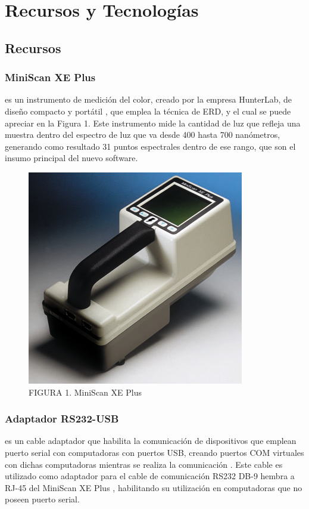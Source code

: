 \documentclass[conference]{IEEEtran}
\begin{document}
\section{Recursos y Tecnolog\'{i}as}	
	
	\subsection{Recursos}
		\subsubsection{MiniScan XE Plus}
		es un instrumento de medici\'{o}n del color, creado por la empresa HunterLab, de dise\~{n}o compacto y port\'{a}til \cite{MiniScanXEPlus-manual}, que emplea la t\'{e}cnica de ERD, y el cual se puede apreciar en la Figura 1. Este instrumento mide la cantidad de luz que refleja una muestra dentro del espectro de luz que va desde 400 hasta 700 nan\'{o}metros, generando como resultado 31 puntos espectrales dentro de ese rango, que son el insumo principal del nuevo software.
		
		\vfill
		\begin{figure}[H]
			\centering
			\label{figura_1}
			\includegraphics[scale=0.9]{img/MiniScanXEPlus}
			\caption{FIGURA 1. MiniScan XE Plus}
		\end{figure}
		\vfill
		
		\subsubsection{Adaptador RS232-USB}
			es un cable adaptador que habilita la comunicaci\'{o}n de dispositivos que emplean puerto serial con computadoras con puertos USB, creando puertos COM virtuales con dichas computadoras mientras se realiza la comunicaci\'{o}n \cite{RS232}. Este cable es utilizado como adaptador para el cable de comunicaci\'{o}n RS232 DB-9 hembra a \mbox{RJ-45} del MiniScan XE Plus \cite{HunterLab-manual}, habilitando su utilizaci\'{o}n en computadoras que no poseen puerto serial.
		
\end{document}
